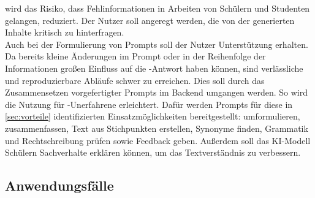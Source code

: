 \documentclass[../main.tex]{subfiles}
\begin{document}
wird das Risiko, dass Fehlinformationen in Arbeiten von Schülern und Studenten gelangen, reduziert. Der Nutzer soll angeregt werden, die von der  generierten Inhalte 
kritisch zu hinterfragen.\\
Auch bei der Formulierung von Prompts soll der Nutzer Unterstützung erhalten. Da bereits kleine Änderungen im Prompt oder in der Reihenfolge der Informationen großen 
Einfluss auf die -Antwort haben können, sind verlässliche und reproduzierbare Abläufe schwer zu erreichen\cite{creativeWriting}. Dies soll durch das Zusammensetzen vorgefertigter 
Prompts im Backend umgangen werden. So wird die Nutzung für -Unerfahrene erleichtert. Dafür werden Prompts für diese in \autoref{sec:vorteile} identifizierten 
Einsatzmöglichkeiten bereitgestellt: umformulieren, zusammenfassen, Text aus Stichpunkten erstellen, Synonyme finden, Grammatik und Rechtschreibung prüfen sowie Feedback geben. Außerdem soll das KI-Modell
Schülern Sachverhalte erklären können, um das Textverständnis zu verbessern.


\subsection{Anwendungsfälle}
\end{document}
